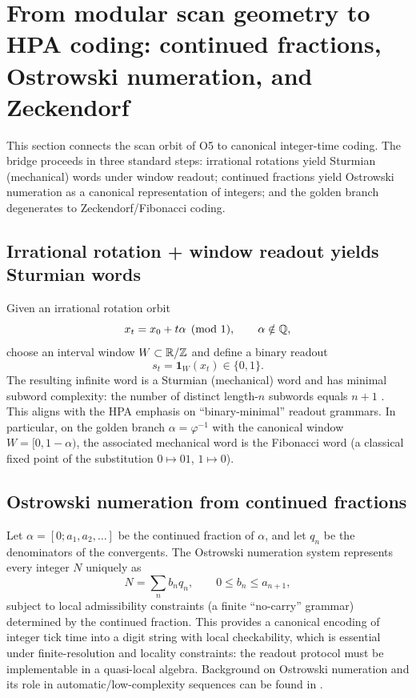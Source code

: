 \section{From modular scan geometry to HPA coding: continued fractions, Ostrowski numeration, and Zeckendorf}
\label{sec:canonical_coding}

This section connects the scan orbit of O5 to canonical integer-time coding. The bridge proceeds in three standard steps: irrational rotations yield Sturmian (mechanical) words under window readout; continued fractions yield Ostrowski numeration as a canonical representation of integers; and the golden branch degenerates to Zeckendorf/Fibonacci coding.

\subsection{Irrational rotation + window readout yields Sturmian words}
\label{sec:sturmian_words}

Given an irrational rotation orbit
\begin{equation}
x_t = x_0 + t\alpha \pmod 1,\qquad \alpha\notin\mathbb{Q},
\end{equation}
choose an interval window $W\subset \mathbb{R}/\mathbb{Z}$ and define a binary readout
\begin{equation}
s_t = \mathbf{1}_W(x_t)\in\{0,1\}.
\end{equation}
The resulting infinite word is a Sturmian (mechanical) word and has minimal subword complexity: the number of distinct length-$n$ subwords equals $n+1$ \cite{MorseHedlund1940,Lothaire2002}. This aligns with the HPA emphasis on ``binary-minimal'' readout grammars.
In particular, on the golden branch $\alpha=\varphi^{-1}$ with the canonical window $W=[0,1-\alpha)$, the associated mechanical word is the Fibonacci word (a classical fixed point of the substitution $0\mapsto 01$, $1\mapsto 0$).

\subsection{Ostrowski numeration from continued fractions}
\label{sec:ostrowski}

Let $\alpha=[0;a_1,a_2,\ldots]$ be the continued fraction of $\alpha$, and let $q_n$ be the denominators of the convergents. The Ostrowski numeration system represents every integer $N$ uniquely as
\begin{equation}
N = \sum_{n} b_n q_n,
\qquad 0\le b_n \le a_{n+1},
\end{equation}
subject to local admissibility constraints (a finite ``no-carry'' grammar) determined by the continued fraction. This provides a canonical encoding of integer tick time into a digit string with local checkability, which is essential under finite-resolution and locality constraints: the readout protocol must be implementable in a quasi-local algebra.
Background on Ostrowski numeration and its role in automatic/low-complexity sequences can be found in \cite{AlloucheShallit2003}.

